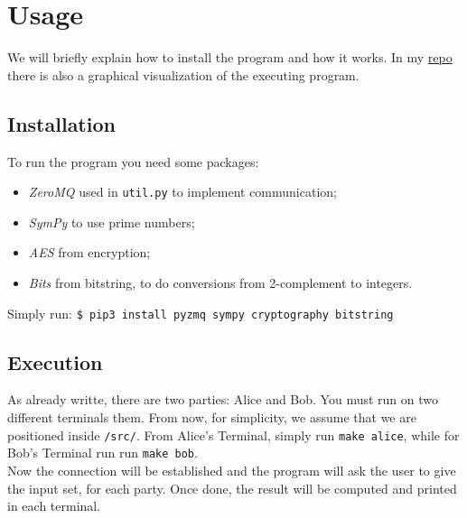 \documentclass[12pt]{article}
\newcommand{\inlinecode}{\texttt}
\begin{document}
\section{Usage}
We will briefly explain how to install the program and how it works. In my \hyperref[zanoGit]{repo} there is also a graphical visualization of the executing program. 
\subsection{Installation}
To run the program you need some packages:
\begin{itemize}
    \item \textit{ZeroMQ} used in \inlinecode{util.py} to implement communication;
    \item \textit{SymPy} to use prime numbers;
    \item \textit{AES} from encryption;
    \item \textit{Bits} from bitstring, to do conversions from 2-complement to integers.
\end{itemize}
Simply run: 
\inlinecode{\$ pip3 install pyzmq sympy cryptography bitstring}
\subsection{Execution}
As already writte, there are two parties: Alice and Bob. You must run on two different terminals them. From now, for simplicity, we assume that we are positioned inside \inlinecode{/src/}.
From Alice's Terminal, simply run \inlinecode{make alice}, while for Bob's Terminal run run \inlinecode{make bob}.\\
Now the connection will be established and the program will ask the user to give the input set, for each party. Once done, the result will be computed and printed in each terminal.
\end{document}
